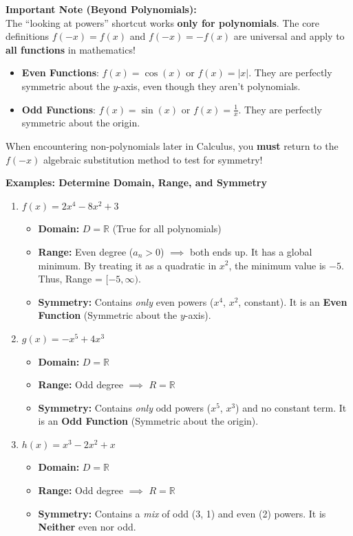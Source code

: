 \documentclass[12pt]{article}
\begin{document}
\vspace{0.5em}
\noindent\textbf{Important Note (Beyond Polynomials):} \\
The ``looking at powers'' shortcut works \textbf{only for polynomials}. The core definitions $f(-x) = f(x)$ and $f(-x) = -f(x)$ are universal and apply to \textbf{all functions} in mathematics!
\begin{itemize}
  \item \textbf{Even Functions}: $f(x) = \cos(x)$ or $f(x) = |x|$. They are perfectly symmetric about the $y$-axis, even though they aren't polynomials.
  \item \textbf{Odd Functions}: $f(x) = \sin(x)$ or $f(x) = \frac{1}{x}$. They are perfectly symmetric about the origin.
\end{itemize}
When encountering non-polynomials later in Calculus, you \textbf{must} return to the $f(-x)$ algebraic substitution method to test for symmetry!

\vspace{1em}
\noindent\textbf{Examples: Determine Domain, Range, and Symmetry}
\begin{enumerate}
    \item $f(x) = 2x^4 - 8x^2 + 3$
    \begin{itemize}
        \item \textbf{Domain:} $D = \mathbb{R}$ (True for all polynomials)
        \item \textbf{Range:} Even degree ($a_n > 0$) $\implies$ both ends up. It has a global minimum. By treating it as a quadratic in $x^2$, the minimum value is $-5$. Thus, Range = $[-5, \infty)$.
        \item \textbf{Symmetry:} Contains \textit{only} even powers ($x^4$, $x^2$, constant). It is an \textbf{Even Function} (Symmetric about the $y$-axis).
    \end{itemize}
    
    \item $g(x) = -x^5 + 4x^3$
    \begin{itemize}
        \item \textbf{Domain:} $D = \mathbb{R}$
        \item \textbf{Range:} Odd degree $\implies$ $R = \mathbb{R}$
        \item \textbf{Symmetry:} Contains \textit{only} odd powers ($x^5$, $x^3$) and no constant term. It is an \textbf{Odd Function} (Symmetric about the origin).
    \end{itemize}

    \item $h(x) = x^3 - 2x^2 + x$
    \begin{itemize}
        \item \textbf{Domain:} $D = \mathbb{R}$
        \item \textbf{Range:} Odd degree $\implies$ $R = \mathbb{R}$
        \item \textbf{Symmetry:} Contains a \textit{mix} of odd (3, 1) and even (2) powers. It is \textbf{Neither} even nor odd.
    \end{itemize}
\end{enumerate}
\end{document}
